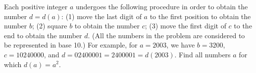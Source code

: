 Each positive integer $a$ undergoes the following procedure in order to obtain the number $d = d(a)$:
(1) move the last digit of $a$ to the first position to obtain the number $b$;
(2) square $b$ to obtain the number $c$;
(3) move the first digit of $c$ to the end to obtain the number $d$.
(All the numbers in the problem are considered to be represented in base 10.) For example, for $a = 2003$, we have $b = 3200$, $c = 10240000$, and $d = 02400001 = 2400001 = d(2003)$.
Find all numbers $a$ for which $d(a) = a^2$.
